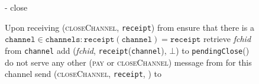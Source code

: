   \begin{figure}[H]
    \begin{systembox}{\fpaynet - close}
      \begin{algorithmic}[1]
        \State Upon receiving (\textsc{closeChannel}, \texttt{receipt}) from
        \alice
        \Indent
          \State ensure that there is a $\mathtt{channel} \in \mathtt{channels}
          : \mathtt{receipt}\left(\mathtt{channel}\right) = \mathtt{receipt}$
          \State retrieve \textit{fchid} from \texttt{channel}
          \label{alg:fpaynet:close:retrieve}
          \State add (\textit{fchid}, \texttt{receipt}(\texttt{channel}),
          $\bot$) to \texttt{pendingClose}(\alice)
          \label{alg:fpaynet:close:mark}
          \State do not serve any other (\textsc{pay} or \textsc{closeChannel})
          message from \alice{} for this channel
          \label{alg:fpaynet:close:noserve}
          \State send (\textsc{closeChannel}, \texttt{receipt}, \alice) to
          \simulator
        \EndIndent
        \Statex


\end{algorithmic}
\end{systembox}
\end{figure}
